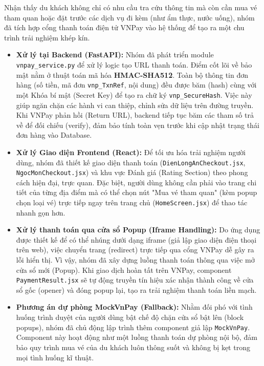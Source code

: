 Nhận thấy du khách không chỉ có nhu cầu tra cứu thông tin mà còn cần mua vé tham quan hoặc đặt trước các dịch vụ đi kèm (như ẩm thực, nước uống), nhóm đã tích hợp cổng thanh toán điện tử VNPay vào hệ thống để tạo ra một chu trình trải nghiệm khép kín.
\begin{itemize}
    \item \textbf{Xử lý tại Backend (FastAPI):} Nhóm đã phát triển module \texttt{vnpay\_service.py} để xử lý logic tạo URL thanh toán. Điểm cốt lõi về bảo mật nằm ở thuật toán mã hóa \textbf{HMAC-SHA512}. Toàn bộ thông tin đơn hàng (số tiền, mã đơn \texttt{vnp\_TxnRef}, nội dung) đều được băm (hash) cùng với một Khóa bí mật (Secret Key) để tạo ra chữ ký \texttt{vnp\_SecureHash}. Việc này giúp ngăn chặn các hành vi can thiệp, chỉnh sửa dữ liệu trên đường truyền. Khi VNPay phản hồi (Return URL), backend tiếp tục băm các tham số trả về để đối chiếu (verify), đảm bảo tính toàn vẹn trước khi cập nhật trạng thái đơn hàng vào Database.
    \item \textbf{Xử lý Giao diện Frontend (React):} Để tối ưu hóa trải nghiệm người dùng, nhóm đã thiết kế giao diện thanh toán (\texttt{DienLongAnCheckout.jsx}, \texttt{NgocMonCheckout.jsx}) và khu vực Đánh giá (Rating Section) theo phong cách hiện đại, trực quan. Đặc biệt, người dùng không cần phải vào trang chi tiết của từng địa điểm mà có thể chọn nút "Mua vé tham quan" (kèm popup chọn loại vé) trực tiếp ngay trên trang chủ (\texttt{HomeScreen.jsx}) để thao tác nhanh gọn hơn.
    \item \textbf{Xử lý thanh toán qua cửa sổ Popup (Iframe Handling):} Do ứng dụng được thiết kế để có thể nhúng dưới dạng iframe (giả lập giao diện điện thoại trên web), việc chuyển trang (redirect) trực tiếp qua cổng VNPay dễ gây ra lỗi hiển thị. Vì vậy, nhóm đã xây dựng luồng thanh toán thông qua việc mở cửa sổ mới (Popup). Khi giao dịch hoàn tất trên VNPay, component \texttt{PaymentResult.jsx} sẽ tự động truyền tín hiệu xác nhận thành công về cửa sổ gốc (opener) và đóng popup lại, tạo ra trải nghiệm thanh toán liền mạch.
    \item \textbf{Phương án dự phòng MockVnPay (Fallback):} Nhằm đối phó với tình huống trình duyệt của người dùng bật chế độ chặn cửa sổ bật lên (block popups), nhóm đã chủ động lập trình thêm component giả lập \texttt{MockVnPay}. Component này hoạt động như một luồng thanh toán dự phòng nội bộ, đảm bảo quy trình mua vé của du khách luôn thông suốt và không bị kẹt trong mọi tình huống kĩ thuật.
\end{itemize}

